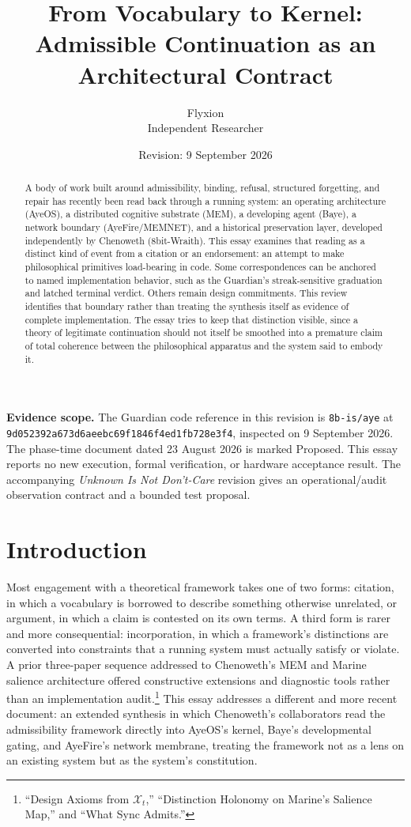 \documentclass[11pt]{article}
\title{\textbf{From Vocabulary to Kernel: Admissible Continuation as an Architectural Contract}}
\author{Flyxion \\ \small Independent Researcher}
\date{Revision: 9 September 2026}
\begin{document}
\maketitle

\begin{abstract}
\noindent A body of work built around admissibility, binding, refusal, structured forgetting, and repair has recently been read back through a running system: an operating architecture (AyeOS), a distributed cognitive substrate (MEM), a developing agent (Baye), a network boundary (AyeFire/MEMNET), and a historical preservation layer, developed independently by Chenoweth (8bit-Wraith). This essay examines that reading as a distinct kind of event from a citation or an endorsement: an attempt to make philosophical primitives load-bearing in code. Some correspondences can be anchored to named implementation behavior, such as the Guardian's streak-sensitive graduation and latched terminal verdict. Others remain design commitments. This review identifies that boundary rather than treating the synthesis itself as evidence of complete implementation. The essay tries to keep that distinction visible, since a theory of legitimate continuation should not itself be smoothed into a premature claim of total coherence between the philosophical apparatus and the system said to embody it.
\end{abstract}

\noindent\textbf{Evidence scope.} The Guardian code reference in this revision is
\nolinkurl{8b-is/aye} at \nolinkurl{9d052392a673d6aeebc69f1846f4ed1fb728e3f4},
inspected on 9 September 2026. The phase-time document dated 23 August 2026 is
marked Proposed. This essay reports no new execution, formal verification,
or hardware acceptance result. The accompanying \emph{Unknown Is Not Don't-Care}
revision gives an operational/audit observation contract and a bounded test proposal.

\section{Introduction}

Most engagement with a theoretical framework takes one of two forms: citation, in which a vocabulary is borrowed to describe something otherwise unrelated, or argument, in which a claim is contested on its own terms. A third form is rarer and more consequential: incorporation, in which a framework's distinctions are converted into constraints that a running system must actually satisfy or violate. A prior three-paper sequence addressed to Chenoweth's MEM and Marine salience architecture offered constructive extensions and diagnostic tools rather than an implementation audit.\footnote{``Design Axioms from $\mathcal{X}_t$,'' ``Distinction Holonomy on Marine's Salience Map,'' and ``What Sync Admits.''} This essay addresses a different and more recent document: an extended synthesis in which Chenoweth's collaborators read the admissibility framework directly into AyeOS's kernel, Baye's developmental gating, and AyeFire's network membrane, treating the framework not as a lens on an existing system but as the system's constitution.
\end{document}
